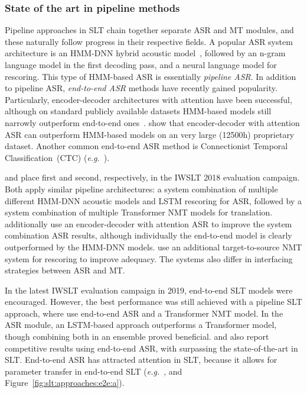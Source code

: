 \documentclass{svjour3}
\begin{document}
\subsubsection{State of the art in pipeline methods}
\label{sec:slt:pipeline}


Pipeline approaches in SLT chain together separate ASR and MT modules, and these naturally follow progress in their respective fields. A popular ASR system architecture is an HMM-DNN hybrid acoustic model~\citep{yu2017recent}, followed by an n-gram language model in the first decoding pass, and a neural language model for rescoring. This type of HMM-based ASR is essentially \emph{pipeline ASR}. In addition to pipeline ASR, \emph{end-to-end ASR} methods have recently gained popularity. Particularly, encoder-decoder architectures with attention have been successful, although on standard publicly available datasets HMM-based models still narrowly outperform end-to-end ones~\citep{luscher2019rwth}. \citet{chiu2018sota} show that encoder-decoder with attention ASR can outperform HMM-based models on an very large (12500h) proprietary dataset. Another common end-to-end ASR method is Connectionist Temporal Classification~(CTC) (\emph{e.g.}~\citet{li2019jasper}).




\citet{wang-sogou-tiic-2018} and \citet{liu2018ustc} place first and second, respectively, in the IWSLT 2018 evaluation campaign. Both apply similar pipeline architectures: a system combination of multiple different HMM-DNN acoustic models and LSTM rescoring for ASR, followed by a system combination of multiple Transformer NMT models for translation. \citet{liu2018ustc} additionally use an encoder-decoder with attention ASR to improve the system combination ASR results, although individually the end-to-end model is clearly outperformed by the HMM-DNN models. \citet{wang-sogou-tiic-2018} use an additional target-to-source NMT system for rescoring to improve adequacy. The systems also differ in interfacing strategies between ASR and MT.

In the latest IWSLT evaluation campaign in 2019, end-to-end SLT models were encouraged. However, the best performance was still achieved with a pipeline SLT approach, where \citet{pham2019iwslt} use end-to-end ASR and a Transformer NMT model. In the ASR module, an LSTM-based approach outperforms a Transformer model, though combining both in an ensemble proved beneficial. \citet{weiss-s2s-st-2017} and \citet{pino2019harnessing} also report competitive results using end-to-end ASR, with \citet{pino2019harnessing} surpassing the state-of-the-art in SLT. End-to-end ASR has attracted attention in SLT, because it allows for parameter transfer in end-to-end SLT (\emph{e.g.}~\citet{berard-e2e-audiobooks-2018}, and  Figure~\ref{fig:slt:approaches:e2e:a}).
\end{document}
